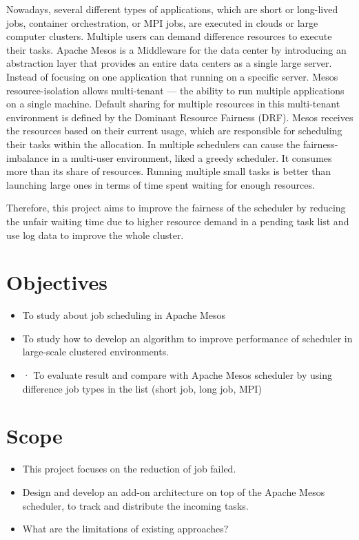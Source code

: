 \documentclass[12pt,oneside,openright,a4paper]{cpe-english-project}
\begin{document}
Nowadays, several different types of applications, which are short or long-lived jobs, container orchestration, or MPI jobs, are executed in clouds or large computer clusters. Multiple users can demand difference resources to execute their tasks. Apache Mesos is a Middleware for the data center by introducing an abstraction layer that provides an entire data centers as a single large server. Instead of focusing on one application that running on a specific server. Mesos resource-isolation allows multi-tenant — the ability to run multiple applications on a single machine. Default sharing for multiple resources in this multi-tenant environment is defined by the Dominant Resource Fairness (DRF). Mesos receives the resources based on their current usage, which are responsible for scheduling their tasks within the allocation. In multiple schedulers can cause the fairness-imbalance in a multi-user environment, liked a greedy scheduler. It consumes more than its share of resources. Running multiple small tasks is better than launching large ones in terms of time spent waiting for enough resources. 

Therefore, this project aims to improve the fairness of the scheduler by reducing the unfair waiting time due to higher resource demand in a pending task list and use log data to improve the whole cluster.


\section{Objectives}
\begin{itemize}
  \item  To study about job scheduling in Apache Mesos
  \item  To study how to develop an algorithm to improve performance of scheduler in large-scale clustered environments.
  \item  ·	To evaluate result and compare with Apache Mesos scheduler by using difference job types in the list (short job, long job, MPI)
\end{itemize}


\section{Scope}
\begin{itemize}
  \item  This project focuses on the reduction of job failed. 
  \item  Design and develop an add-on architecture on top of the Apache Mesos scheduler, to track and distribute the incoming tasks.
  \item  What are the limitations of existing approaches? 
\end{itemize}
\end{document}
